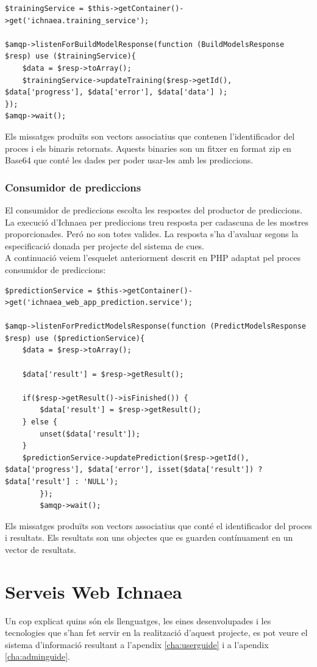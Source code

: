 \begin{lstlisting}
$trainingService = $this->getContainer()->get('ichnaea.training_service');
		
$amqp->listenForBuildModelResponse(function (BuildModelsResponse $resp) use ($trainingService){
	$data = $resp->toArray();
	$trainingService->updateTraining($resp->getId(), $data['progress'], $data['error'], $data['data'] );
});
$amqp->wait();
\end{lstlisting}

Els missatges produïts son vectors associatius que contenen l'identificador del proces i els binaris retornats. Aquests binaries son un fitxer en format zip en Base64 que cont\'{e} les dades per poder usar-les amb les prediccions.

\subsubsection{Consumidor de prediccions}
El consumidor de prediccions escolta les respostes del productor de prediccions.\\

La execució d'Ichnaea per prediccions treu resposta per cadascuna de les mostres proporcionades. Peró no son totes valides. La resposta s'ha d'avaluar segons la especificació donada per projecte del sistema de cues.\\

A continuació veiem l'esquelet anteriorment descrit en PHP adaptat pel proces consumidor de prediccions:

\begin{lstlisting}
$predictionService = $this->getContainer()->get('ichnaea_web_app_prediction.service');
		
$amqp->listenForPredictModelsResponse(function (PredictModelsResponse $resp) use ($predictionService){
	$data = $resp->toArray();
	
	$data['result'] = $resp->getResult();

	if($resp->getResult()->isFinished()) {
 		$data['result'] = $resp->getResult();
	} else {
		unset($data['result']);
	}
	$predictionService->updatePrediction($resp->getId(), $data['progress'], $data['error'], isset($data['result']) ? $data['result'] : 'NULL');
		});
		$amqp->wait();
\end{lstlisting}

Els missatges produïts son vectors associatius que cont\'{e} el identificador del proces i resultats. Els resultats son uns objectes que es guarden contínuament en un vector de resultats.


\section{Serveis Web Ichnaea}
Un cop explicat quins són els llenguatges, les eines desenvolupades i les tecnologies que s’han fet servir en la realització d’aquest projecte, es pot veure el sistema d’informació resultant a l'apendix \ref{cha:userguide}
i a l'apendix \ref{cha:adminguide}.\\ 
 